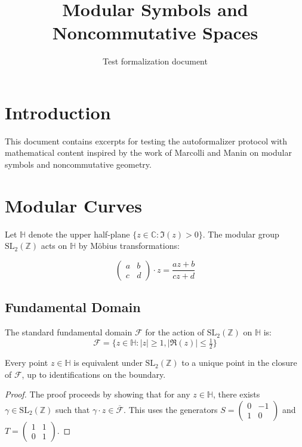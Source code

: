 \documentclass{article}
\title{Modular Symbols and Noncommutative Spaces}
\author{Test formalization document}
\begin{document}
\section{Introduction}
\label{sec:intro}

This document contains excerpts for testing the autoformalizer protocol
with mathematical content inspired by the work of Marcolli and Manin on
modular symbols and noncommutative geometry.

\section{Modular Curves}
\label{sec:modular-curves}

Let $\mathbb{H}$ denote the upper half-plane $\{z \in \mathbb{C} : \Im(z) > 0\}$.
The modular group $\text{SL}_2(\mathbb{Z})$ acts on $\mathbb{H}$ by M\"obius transformations:

$$\begin{pmatrix} a & b \\ c & d \end{pmatrix} \cdot z = \frac{az + b}{cz + d}$$

\subsection{Fundamental Domain}
\label{sec:fundamental-domain}

\begin{definition}
\label{def:fundamental-domain}
The standard fundamental domain $\mathcal{F}$ for the action of $\text{SL}_2(\mathbb{Z})$
on $\mathbb{H}$ is:
$$\mathcal{F} = \{z \in \mathbb{H} : |z| \geq 1, |\Re(z)| \leq \tfrac{1}{2}\}$$
\end{definition}

\begin{theorem}
\label{thm:fundamental-domain}
Every point $z \in \mathbb{H}$ is equivalent under $\text{SL}_2(\mathbb{Z})$ to a unique
point in the closure of $\mathcal{F}$, up to identifications on the boundary.
\end{theorem}

\begin{proof}
The proof proceeds by showing that for any $z \in \mathbb{H}$, there exists
$\gamma \in \text{SL}_2(\mathbb{Z})$ such that $\gamma \cdot z \in \overline{\mathcal{F}}$.
This uses the generators $S = \begin{pmatrix} 0 & -1 \\ 1 & 0 \end{pmatrix}$
and $T = \begin{pmatrix} 1 & 1 \\ 0 & 1 \end{pmatrix}$.
\end{proof}
\end{document}
